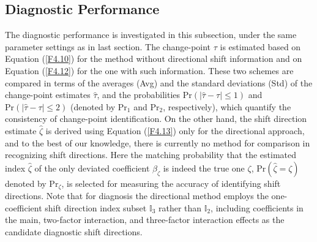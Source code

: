 \subsection{Diagnostic Performance}

The diagnostic performance is investigated in this subsection, under the same
parameter settings as in last section. The change-point $\tau$ is estimated based on
Equation (\ref{F4.10}) for the method without directional shift information and on
Equation (\ref{F4.12}) for the one with such information. These two schemes are
compared in terms of the averages (Avg) and the standard deviations (Std) of the
change-point estimates $\hat{\tau}$, and the probabilities
$\mathrm{Pr}(|\hat{\tau}-\tau|\leq 1)$ and $\mathrm{Pr}(|\hat{\tau}-\tau|\leq 2)$
(denoted by $\mathrm{Pr}_1$ and $\mathrm{Pr}_2$, respectively), which quantify the
consistency of change-point identification. On the other hand, the shift direction
estimate $\hat{\zeta}$ is derived using Equation (\ref{F4.13}) only for the
directional approach, and to the best of our knowledge, there is currently no method
for comparison in recognizing shift directions. Here the matching probability that
the estimated index $\hat{\zeta}$ of the only deviated coefficient $\beta_{\zeta}$
is indeed the true one $\zeta$, $\mathrm{Pr}(\hat{\zeta}=\zeta)$ denoted by
$\mathrm{Pr}_{\zeta}$, is selected for measuring the accuracy of identifying shift
directions. Note that for diagnosis the directional method employs the
one-coefficient shift direction index subset $\mathbb{I}_3$ rather than
$\mathbb{I}_2$, including coefficients in the main, two-factor interaction, and
three-factor interaction effects as the candidate diagnostic shift directions.

